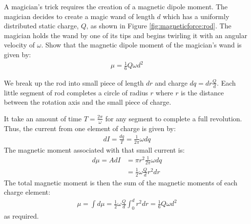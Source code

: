 \question A magician's trick requires the creation of a magnetic dipole moment. The magician decides to create a magic wand of length $d$ which has a uniformly distributed static charge, $Q$, as shown in Figure \ref{fig:magneticforce:rod}. The magician holds the wand by one of its tips and begins twirling it with an angular velocity of $\omega$. Show that the magnetic dipole moment of the magician's wand is given by:
\begin{align*}
\mu=\frac{1}{6}Q\omega d^2
\end{align*}
\begin{solution}
We break up the rod into small piece of length $dr$ and charge $dq=dr\frac{Q}{d}$. Each little segment of rod completes a circle of radius $r$ where $r$ is the distance between the rotation axis and the small piece of charge. 

It take an amount of time $T=\frac{2\pi}{\omega}$ for any segment to complete a full revolution. Thus, the current from one element of charge is given by:
\begin{align*}
dI=\frac{dq}{T}=\frac{1}{2\pi}\omega dq
\end{align*}
The magnetic moment associated with that small current is:
\begin{align*}
d\mu=A dI &= \pi r^2 \frac{1}{2\pi}\omega dq\\
&=\frac{1}{2}\omega\frac{Q}{d} r^2dr
\end{align*}
The total magnetic moment is then the sum of the magnetic moments of each charge element:
\begin{align*}
\mu=\int d\mu=\frac{1}{2}\omega\frac{Q}{d}\int_0^dr^2dr=\frac{1}{6}Q\omega d^2
\end{align*}
as required. 
\end{solution}


